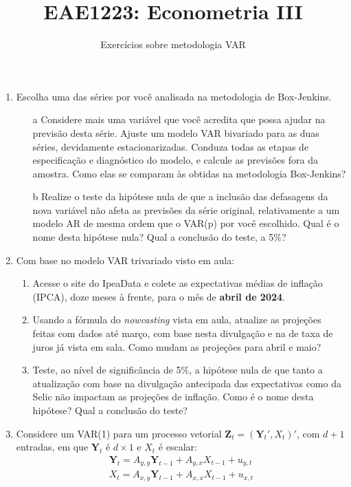 \documentclass[10pt,a4paper]{article}
\title{\large EAE1223: Econometria III}
\author{\normalsize Exercícios sobre metodologia VAR}
\date{}
\begin{document}
	\maketitle
	\begin{enumerate}
\item Escolha uma das séries por você analisada na metodologia de Box-Jenkins.
\begin{enumerate}
	\item[a] Considere mais uma variável que você acredita que possa ajudar na previsão desta série. Ajuste um modelo VAR bivariado para as duas séries, devidamente estacionarizadas. Conduza todas as etapas de especificação e diagnóstico do modelo, e calcule as previsões fora da amostra. Como elas se comparam às obtidas na metodologia Box-Jenkins?
	\item[b] Realize o teste da hipótese nula de que a inclusão das defasagens da nova variável não afeta as previsões da série original, relativamente a um modelo AR de mesma ordem que o VAR(p) por você escolhido. Qual é o nome desta hipótese nula? Qual a conclusão do teste, a 5\%?
\end{enumerate}
\item Com base no modelo VAR trivariado visto em aula:
\begin{enumerate}
	\item Acesse o site do IpeaData e colete as expectativas médias de inflação (IPCA), doze meses à frente, para o mês de \textbf{abril de 2024}.
	\item Usando a fórmula do \textit{nowcasting} vista em aula, atualize as projeções feitas com dados até março, com base nesta divulgação e na de taxa de juros já vista em sala. Como mudam as projeções para abril e maio?
	\item Teste, ao nível de significância de 5\%, a hipótese nula de que tanto a atualização com base na divulgação antecipada das expectativas como da Selic não impactam as projeções de inflação. Como é o nome desta hipótese? Qual a conclusão do teste?
\end{enumerate}

\item Considere um VAR(1) para um processo vetorial $\boldsymbol{Z}_t = (\boldsymbol{Y}_t', X_t)'$, com $d+1$ entradas, em que $\boldsymbol{Y}_t$ é $d\times 1$ e $X_t$ é escalar:
\begin{align}
\boldsymbol{Y}_t = A_{y,y}\boldsymbol{Y}_{t-1} + A_{y,x}X_{t-1} + u_{y,t}  \label{eq_full}
\\
X_t = A_{x,y}\boldsymbol{Y}_{t-1} + A_{x,x}X_{t-1} + u_{x,t}  \label{eq_marginal}
\end{align}


\end{enumerate}
\end{document}

